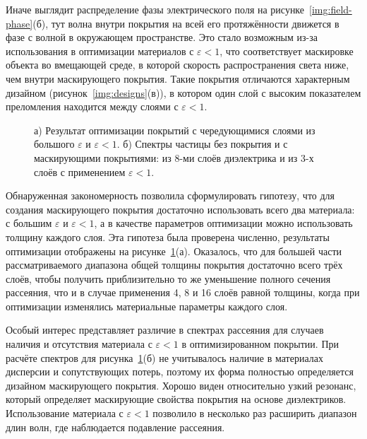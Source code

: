 Иначе выглядит распределение фазы электрического поля на
рисунке~\ref{img:field-phase}(б), тут волна внутри покрытия на всей его
протяжённости движется в фазе с волной в окружающем пространстве. Это
стало возможным из-за использования в оптимизации материалов с
${\varepsilon<1}$, что соответствует маскировке объекта во вмещающей
среде, в которой скорость распространения света ниже, чем внутри
маскирующего покрытия.  Такие покрытия отличаются характерным дизайном
(рисунок~\ref{img:designs}(в)), в котором один слой с высоким
показателем преломления находится между слоями с ${\varepsilon<1}$.
\begin{figure}[t]
  \begin{minipage}[ht]{0.49\linewidth}
  \end{minipage}
  \hfill
  \begin{minipage}[ht]{0.49\linewidth}
  \end{minipage}
  \caption{а) Результат оптимизации покрытий с чередующимися слоями из
    большого $\varepsilon$ и ${\varepsilon<1}$. б) Спектры частицы
  без покрытия и с маскирующими покрытиями: из 8-ми слоёв диэлектрика и
  из 3-х слоёв с применением ${\varepsilon<1}$.}
  \label{img:min-max-min}  
\end{figure}

Обнаруженная закономерность позволила сформулировать гипотезу,
что для создания маскирующего покрытия достаточно использовать всего
два материала: с большим $\varepsilon$ и ${\varepsilon<1}$, а в
качестве параметров оптимизации можно использовать толщину каждого
слоя. Эта гипотеза была проверена численно, результаты оптимизации
отображены на рисунке~\ref{img:min-max-min}(а). Оказалось, что для
большей части рассматриваемого диапазона общей толщины покрытия 
достаточно всего трёх слоёв, чтобы получить приблизительно то же
уменьшение полного сечения рассеяния, что и в случае применения 4, 8 и
16 слоёв равной толщины, когда при оптимизации
изменялись материальные параметры каждого слоя.

Особый интерес представляет различие в спектрах рассеяния для случаев
наличия и отсутствия материала с ${\varepsilon<1}$ в оптимизированном
покрытии.  При расчёте спектров для рисунка~\ref{img:min-max-min}(б) не
учитывалось наличие в материалах дисперсии и сопутствующих потерь,
поэтому их форма полностью определяется дизайном маскирующего
покрытия. Хорошо виден относительно узкий резонанс, который определяет
маскирующие свойства покрытия на основе диэлектриков. Использование
материала с ${\varepsilon<1}$ позволило в несколько раз расширить
диапазон длин волн, где наблюдается подавление рассеяния. 

\clearpage